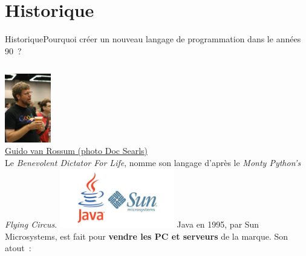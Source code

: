 \documentclass{beamer}
\begin{document}
    \section{Historique}\label{sec:history}
    \begin{frame}{Historique}{Pourquoi créer un nouveau langage de programmation dans le années 90~?}
        \begin{footnotesize}
            \begin{columns}
                \centering
                \includegraphics[width=2cm]{image/guido-van-rossum} \\ \href{https://www.flickr.com/photos/docsearls/}{Guido van Rossum (photo Doc Searls)} \\
                Le \textit{Benevolent Dictator For Life}, nomme son langage d'après le \textit{Monty Python’s Flying Circus}.
                \bigbreak
                \centering
                \includegraphics[width=5cm]{image/sun-java-logo}
                \flushleft
                Java en 1995, par Sun Microsystems, est fait pour \textbf{vendre les PC et serveurs} de la marque.
                \bigbreak
                Son atout~: \footnotemark
            \end{columns}
        \end{footnotesize}
    \end{frame}
\end{document}
